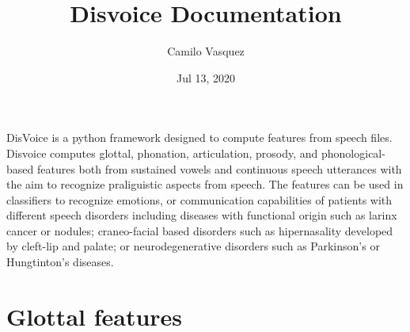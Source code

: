 \documentclass[letterpaper,10pt,english]{sphinxmanual}
\title{Disvoice Documentation}
\date{Jul 13, 2020}
\author{Camilo Vasquez}
\begin{document}
\maketitle
\sphinxtableofcontents
{}\label{\detokenize{index::doc}}


DisVoice is a python framework designed to compute features from speech files. Disvoice computes glottal, phonation, articulation, prosody, and phonological-based features both from sustained vowels and continuous speech utterances with the aim to recognize praliguistic aspects from speech.
The features can be used in classifiers to recognize emotions, or communication capabilities of patients with different speech disorders including diseases with functional origin such as larinx cancer or nodules; craneo-facial based disorders such as hipernasality developed by cleft-lip and palate; or neurodegenerative disorders such as Parkinson's or Hungtinton's diseases.


\chapter{Glottal features}
\label{\detokenize{Glottal::doc}}\label{\detokenize{Glottal:glottal-features}}\label{\detokenize{Glottal:welcome-to-disvoice-s-documentation}}\label{\detokenize{Glottal:module-glottal}}
\end{document}
